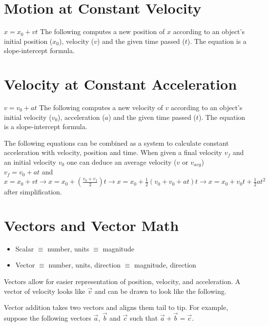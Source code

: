 \documentclass{article}
\begin{document}
\section{Motion at Constant Velocity}
$x = x_0 + vt$
The following computes a new position of $x$ according to an object's initial position ($x_0$), velocity ($v$) and the given time passed ($t$). The equation is a slope-intercept formula.

\section{Velocity at Constant Acceleration}
$v = v_0 + at$
The following computes a new velocity of $v$ according to an object's initial velocity ($v_0$), acceleration ($a$) and the given time passed ($t$). The equation is a slope-intercept formula.

The following equations can be combined as a system to calculate constant acceleration with velocity, position and time.
When given a final velocity $v_f$ and an initial velocity $v_0$ one can deduce an average velocity ($v$ or $v_{avg}$)\\
$v_f = v_0 + at$ and $x = x_0 + vt \to x = x_0 + (\frac{v_0 + v_f}{2})t \to x = x_0 + \frac{1}{2}(v_0 + v_0 + at)t \to x = x_0 + v_0t + \frac{1}{2}at^2$ after simplification.

\section{Vectors and Vector Math}
\begin{itemize}
  \item Scalar $\equiv$ number, units $\equiv$ magnitude
  \item Vector $\equiv$ number, units, direction $\equiv$ magnitude, direction
\end{itemize}

Vectors allow for easier representation of position, velocity, and acceleration. A vector of velocity looks like $\vec{v}$ and can be drawn to look like the following.


Vector addition takes two vectors and aligns them tail to tip. For example, suppose the following vectors $\vec{a}$, $\vec{b}$ and $\vec{c}$ such that $\vec{a} + \vec{b} = \vec{c}$.
\end{document}
